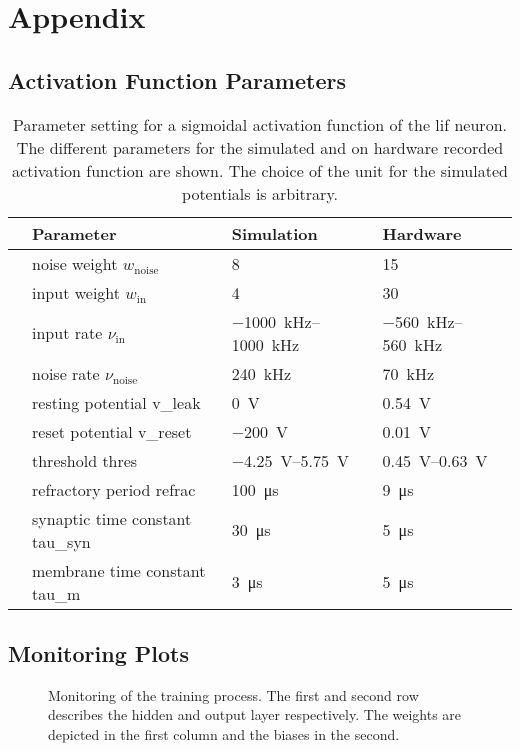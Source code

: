 \appendix
\chapter{Appendix}
\section{Activation Function Parameters}
\begin{table}[h!]\centering{}
	\begin{tabular}{@{}rlll@{}}\toprule
		& Parameter							& 	Simulation 				& 	Hardware 				\\ \midrule
		& noise weight $w_\text{noise}$		& 	8						&	15						\\
		& input weight $w_\text{in}$		&  	4						& 	30						\\
		& input rate $\nu_\text{in}$		&	\SIrange{-1000}{1000}{\kilo \Hz}& \SIrange{-560}{560}{\kilo \Hz}		\\
		& noise rate $\nu_\text{noise}$		&	\SI{240}{\kilo \Hz}		& 	\SI{70}{\kilo \Hz}		\\
		& resting potential \gls{v_leak}	&	\SI{0}{\V}				& 	\SI{0.54}{\V}			\\
		& reset potential \gls{v_reset}		&	\SI{-200}{\V}			& 	\SI{0.01}{\V}			\\
		& threshold \gls{thres}				&\SIrange{-4.25}{5.75}{\V}	& 	\SIrange{0.45}{0.63}{\V}\\
		& refractory period \gls{refrac}	&	\SI{100}{\micro \s}		&	\SI{9}{\micro \s}		\\
		& synaptic time constant \gls{tau_syn} 	&\SI{30}{\micro \s}		&	\SI{5}{\micro \s}		\\
		& membrane time constant \gls{tau_m}	&\SI{3}{\micro \s}		&	\SI{5}{\micro \s}		\\
		\bottomrule
	\end{tabular}
	\caption[Parameter setting for a sigmoidal activation function of the \gls{lif} neuron.]{Parameter setting for a sigmoidal activation function of the \gls{lif} neuron. The different parameters for the simulated and on hardware recorded activation function are shown. The choice of the unit for the simulated potentials is arbitrary.}
	\label{hardwarevssimulationtable}
\end{table}
\newpage
\section{Monitoring Plots}
\label{monitoringplots}
\begin{figure}[!htb]
	\centering
    
	\caption[Monitoring of the training process.]{Monitoring of the training process. The first and second row describes the hidden and output layer respectively. The weights are depicted in the first column and the biases in the second.}
	\label{network_monitoring}
\end{figure}